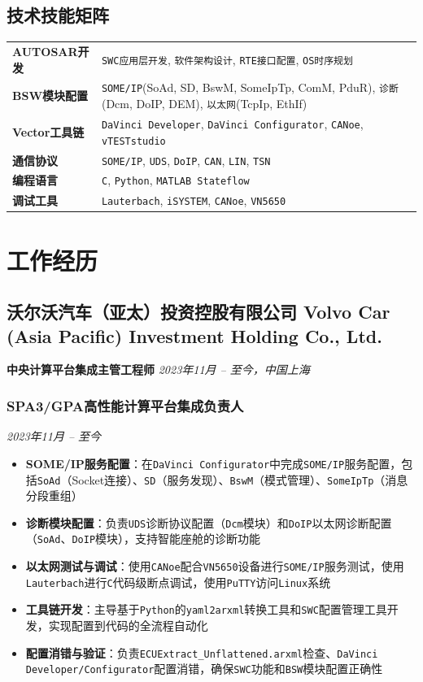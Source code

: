 \documentclass[11pt,a4paper]{ctexart}
\newcommand{\highlight}[1]{\textcolor{primary}{\textbf{#1}}}
\newcommand{\tech}[1]{\textcolor{techblue}{\texttt{#1}}}
\begin{document}
\subsection*{技术技能矩阵}

\begin{tabularx}{0.92\textwidth}{@{}>{\bfseries}l X@{}}
  AUTOSAR开发 & \tech{SWC应用层开发}, \tech{软件架构设计}, \tech{RTE接口配置}, \tech{OS时序规划} \\
  BSW模块配置 & \tech{SOME/IP}(SoAd, SD, BswM, SomeIpTp, ComM, PduR), \tech{诊断}(Dcm, DoIP, DEM), \tech{以太网}(TcpIp, EthIf) \\
  Vector工具链 & \tech{DaVinci Developer}, \tech{DaVinci Configurator}, \tech{CANoe}, \tech{vTESTstudio} \\
  通信协议 & \tech{SOME/IP}, \tech{UDS}, \tech{DoIP}, \tech{CAN}, \tech{LIN}, \tech{TSN} \\
  编程语言 & \tech{C}, \tech{Python}, \tech{MATLAB Stateflow} \\
  调试工具 & \tech{Lauterbach}, \tech{iSYSTEM}, \tech{CANoe}, \tech{VN5650}
\end{tabularx}

\section*{工作经历}

\subsection*{沃尔沃汽车（亚太）投资控股有限公司 Volvo Car (Asia Pacific) Investment Holding Co., Ltd.}
\textbf{中央计算平台集成主管工程师} \hfill \textit{2023年11月 -- 至今，中国上海}

\subsubsection*{SPA3/GPA高性能计算平台集成负责人}
\hfill \textit{2023年11月 -- 至今}

\begin{itemize}
  \item[\ding{51}] \highlight{SOME/IP服务配置}：在\tech{DaVinci Configurator}中完成\tech{SOME/IP}服务配置，包括\tech{SoAd}（Socket连接）、\tech{SD}（服务发现）、\tech{BswM}（模式管理）、\tech{SomeIpTp}（消息分段重组）
  \item[\ding{51}] \highlight{诊断模块配置}：负责\tech{UDS}诊断协议配置（\tech{Dcm}模块）和\tech{DoIP}以太网诊断配置（\tech{SoAd}、\tech{DoIP}模块），支持智能座舱的诊断功能
  \item[\ding{51}] \highlight{以太网测试与调试}：使用\tech{CANoe}配合\tech{VN5650}设备进行\tech{SOME/IP}服务测试，使用\tech{Lauterbach}进行\tech{C}代码级断点调试，使用\tech{PuTTY}访问\tech{Linux}系统
  \item[\ding{51}] \highlight{工具链开发}：主导基于\tech{Python}的\tech{yaml2arxml}转换工具和\tech{SWC}配置管理工具开发，实现配置到代码的全流程自动化
  \item[\ding{51}] \highlight{配置消错与验证}：负责\tech{ECUExtract\_Unflattened.arxml}检查、\tech{DaVinci Developer/Configurator}配置消错，确保\tech{SWC}功能和\tech{BSW}模块配置正确性
\end{itemize}
\end{document}

